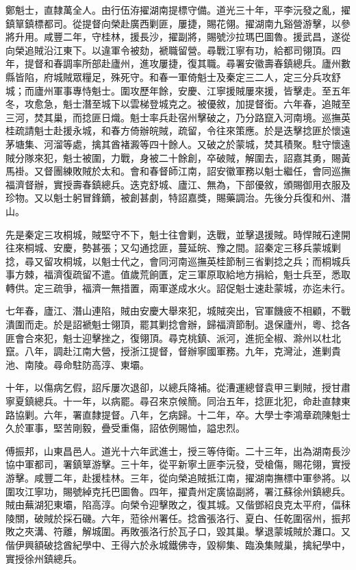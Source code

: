 \begin{pinyinscope}
鄭魁士，直隸萬全人。由行伍洊擢湖南提標守備。道光三十年，平李沅發之亂，擢鎮筸鎮標都司。從提督向榮赴廣西剿匪，屢捷，賜花翎。擢湖南九谿營游擊，以參將升用。咸豐二年，守桂林，援長沙，擢副將，賜號沙拉瑪巴圖魯。援武昌，遂從向榮追賊沿江東下。以違軍令被劾，褫職留營。尋戰江寧有功，給都司翎頂。四年，提督和春調率所部赴廬州，進攻屢捷，復其職。尋署安徽壽春鎮總兵。廬州數縣皆陷，府城賊眾糧足，殊死守。和春一軍倚魁士及秦定三二人，定三分兵攻舒城；而廬州軍事專恃魁士。圍攻歷年餘，安慶、江寧援賊屢來援，皆擊走。至五年冬，攻愈急，魁士潛至城下以雲梯登城克之。被優敘，加提督銜。六年春，追賊至三河，焚其巢，而捻匪日熾。魁士率兵赴宿州擊破之，乃分路竄入河南境。巡撫英桂疏請魁士赴援永城，和春方倚辦皖賊，疏留，令往來策應。於是迭擊捻匪於懷遠茅塘集、河溜等處，擒其酋褚澱等四十餘人。又破之於蒙城，焚其積聚。駐守懷遠賊分隊來犯，魁士被圍，力戰，身被二十餘創，卒破賊，解圍去，詔嘉其勇，賜黃馬褂。又督團練敗賊於太和。會和春督師江南，詔安徽軍務以魁士繼任，會同巡撫福濟督辦，實授壽春鎮總兵。迭克舒城、廬江、無為，下部優敘，頒賜御用衣服及珍物。又以魁士躬冒鋒鏑，被創甚劇，特詔嘉獎，賜藥調治。先後分兵復和州、潛山。

先是秦定三攻桐城，賊堅守不下，魁士往會剿，迭戰，並擊退援賊。時悍賊石達開往來桐城、安慶，勢甚張；又勾通捻匪，蔓延皖、豫之間。詔秦定三移兵蒙城剿捻，尋又留攻桐城，以魁士代之，會同河南巡撫英桂節制三省剿捻之兵；而桐城兵事方棘，福濟復疏留不遣。值歲荒餉匱，定三軍原取給地方捐給，魁士兵至，悉取轉供。定三疏爭，福濟一無措置，兩軍遂成水火。詔促魁士速赴蒙城，亦迄未行。

七年春，廬江、潛山連陷，賊由安慶大舉來犯，城賊突出，官軍饑疲不相顧，不戰潰圍而走。於是詔褫魁士翎頂，罷其剿捻會辦，歸福濟節制。退保廬州，粵、捻各匪會合來犯，魁士迎擊挫之，復翎頂。尋克桃鎮、派河，進扼全椒、滁州以杜北竄。八年，調赴江南大營，授浙江提督，督辦寧國軍務。九年，克灣沚，進剿貴池、南陵。尋命駐防高淳、東壩。

十年，以傷病乞假，詔斥屢次退卻，以總兵降補。從漕運總督袁甲三剿賊，授甘肅寧夏鎮總兵。十一年，以病罷。尋召來京候簡。同治五年，捻匪北犯，命赴直隸東路協剿。六年，署直隸提督。八年，乞病歸。十二年，卒。大學士李鴻章疏陳魁士久於軍事，堅苦剛毅，疊受重傷，詔依例賜恤，謚忠烈。

傅振邦，山東昌邑人。道光十六年武進士，授三等侍衛。二十三年，出為湖南長沙協中軍都司，署鎮筸游擊。三十年，從平新寧土匪李沅發，受槍傷，賜花翎，實授游擊。咸豐二年，赴援桂林。三年，從向榮追賊抵江南，擢湖南撫標中軍參將。以圍攻江寧功，賜號綽克托巴圖魯。四年，擢貴州定廣協副將，署江蘇徐州鎮總兵。賊由蕪湖犯東壩，陷高淳。向榮令迎擊敗之，復其城。又偕鄧紹良克太平府，偪秣陵關，破賊於採石磯。六年，蒞徐州署任。捻酋張洛行、夏白、任乾圍宿州，振邦敗之夾溝、符離，解城圍。再敗張洛行於瓦子口，毀其巢。擊退蒙城賊於灘口。又偕伊興額破捻酋紀學中、王得六於永城鐵佛寺，毀柳集、臨渙集賊巢，擒紀學中，實授徐州鎮總兵。


\end{pinyinscope}
